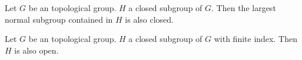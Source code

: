 \begin{theorem}
	\leanok
	Let $G$ be an topological group. $H$ a closed subgroup of $G$. Then the largest normal subgroup contained in $H$ is also closed.
\end{theorem}

\begin{theorem}
	\leanok
	Let $G$ be an topological group. $H$ a closed subgroup of $G$ with finite index. Then $H$ is also open.
\end{theorem}













